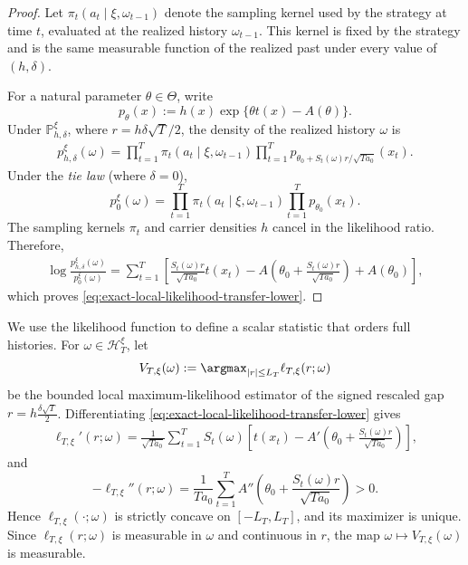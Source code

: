 \documentclass[10pt]{article}
\theoremstyle{plain}
\begin{document}
\begin{proof}
Let $\pi_t(a_t\mid\xi,\omega_{t-1})$ denote the sampling kernel used by
the strategy at time $t$, evaluated at the realized history
$\omega_{t-1}$. This kernel is fixed by the strategy and is the same
measurable function of the realized past under every value of
$(h,\delta)$.

For a natural parameter $\theta\in\Theta$, write
\[
    p_\theta(x)
    :=
    h(x)\exp\{\theta t(x)-A(\theta)\}.
\] 
Under $\mathbb P_{h,\delta}^{\xi}$, where
$r=h\delta\sqrt T/2$, the density of the realized history $\omega$ is
\[
\begin{aligned}
    p_{h,\delta}^\xi(\omega)
    =
    \prod_{t=1}^T
        \pi_t(a_t\mid\xi,\omega_{t-1})
    \prod_{t=1}^T
        p_{\theta_0+S_t(\omega)r/\sqrt{Ta_0}}(x_t).
\end{aligned}
\]
Under the \emph{tie law} (where $\delta=0$),
\[
    p_0^\xi(\omega)
    =
    \prod_{t=1}^T
        \pi_t(a_t\mid\xi,\omega_{t-1})
    \prod_{t=1}^T
        p_{\theta_0}(x_t).
\]
The sampling kernels $\pi_t$ and carrier densities $h$ cancel in the likelihood ratio.
Therefore,
\[
\begin{aligned}
    \log
    \frac{
        p_{h,\delta}^\xi(\omega)
    }{
        p_0^\xi(\omega)
    }
    =
    \sum_{t=1}^T
    \left[
        \frac{S_t(\omega)r}{\sqrt{Ta_0}}t(x_t)
        -
        A\left(
            \theta_0+
            \frac{S_t(\omega)r}{\sqrt{Ta_0}}
        \right)
        +
        A(\theta_0)
    \right],
\end{aligned}
\]
which proves
\eqref{eq:exact-local-likelihood-transfer-lower}.

\end{proof}

We use the likelihood function to define a scalar statistic that orders full histories. For $\omega\in\mathcal H_T^\xi$, let
\begin{equation}
\label{eq:local-mle-transfer-lower}
    V_{T,\xi}(\omega)
    :=
    \argmax_{|r|\le L_T}
        \ell_{T,\xi}(r;\omega)
\end{equation}
be the bounded local maximum-likelihood estimator of the signed rescaled gap $r=h\frac{\delta\sqrt T}{2}$.
Differentiating \eqref{eq:exact-local-likelihood-transfer-lower} gives
\[
\begin{aligned}
    \ell_{T,\xi}'(r;\omega)
    =
    \frac{1}{\sqrt{Ta_0}}
    \sum_{t=1}^T
        S_t(\omega)
        \left[
            t(x_t)
            -
            A'\left(
                \theta_0+
                \frac{S_t(\omega)r}{\sqrt{Ta_0}}
            \right)
        \right],
\end{aligned}
\]
and
\begin{equation}
\label{eq:exact-curvature-transfer-lower}
    -\ell_{T,\xi}''(r;\omega)
    =
    \frac{1}{Ta_0}
    \sum_{t=1}^T
        A''\left(
            \theta_0+
            \frac{S_t(\omega)r}{\sqrt{Ta_0}}
        \right)
    >
    0.
\end{equation}
Hence $\ell_{T,\xi}(\cdot;\omega)$ is strictly concave on
$[-L_T,L_T]$, and its maximizer is unique. Since
$\ell_{T,\xi}(r;\omega)$ is measurable in $\omega$ and continuous in $r$,
the map $\omega\mapsto V_{T,\xi}(\omega)$ is measurable.
\end{document}
